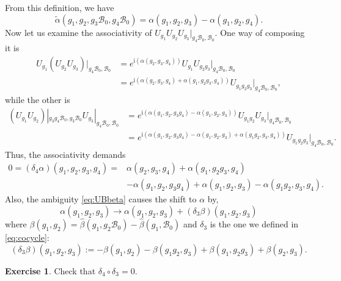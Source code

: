 \documentclass[
]{scrartcl}
\numberwithin{equation}{section}
\renewenvironment{align}{\begin{equation}\begin{aligned}}{\end{aligned}\end{equation}}
\theoremstyle{definition}
\theoremstyle{definition}
\theoremstyle{definition}
\newtheorem{exercise}{Exercise}[section]
\theoremstyle{definition}
\theoremstyle{remark}
\begin{document}
From this definition, we have
\begin{equation}
    \label{eq:alphatildealpha}
    \tilde{\alpha}(g_1,g_2,g_3\mathcal{B}_0,g_4\mathcal{B}_0) =     
    \alpha(g_1,g_2,g_3) - \alpha(g_1,g_2,g_4).
\end{equation}
Now let us examine the associativity of \(U_{g_1}U_{g_2}U_{g_3}|_{g_4\mathcal{B}_0,\mathcal{B}_0}\).
One way of composing it is
\begin{align}
    \label{eq:associative1}
    U_{g_1}(U_{g_2}U_{g_3})|_{g_4\mathcal{B}_0,\mathcal{B}_0}
    &= e^{\mathrm{i}(\alpha(g_2,g_3,g_4))}U_{g_1}U_{g_2g_3}|_{g_4\mathcal{B}_0,\mathcal{B}_0}\\
    &= e^{\mathrm{i}(\alpha(g_2,g_3,g_4)+\alpha(g_1,g_2g_3,g_4))}U_{g_1g_2g_3}|_{g_4\mathcal{B}_0,\mathcal{B}_0},
\end{align}
while the other is
\begin{align}
    \label{eq:associative2}
    (U_{g_1}U_{g_2})|_{g_3g_4\mathcal{B}_0,g_3\mathcal{B}_0}U_{g_3}|_{g_4\mathcal{B}_0,\mathcal{B}_0}
    &= e^{\mathrm{i}(\alpha(g_1,g_2,g_3g_4)-\alpha(g_1,g_2,g_3))}U_{g_1g_2}U_{g_3}|_{g_4\mathcal{B}_0,\mathcal{B}_0}\\
    &= e^{\mathrm{i}(\alpha(g_1,g_2,g_3g_4)-\alpha(g_1,g_2,g_3)+\alpha(g_1g_2,g_3,g_4))}U_{g_1g_2g_3}|_{g_4\mathcal{B}_0,\mathcal{B}_0}.
\end{align}
Thus, the associativity demands
\begin{align}
    \label{eq:3cocycle}
    0 = (\delta_4 \alpha) (g_1,g_2,g_3,g_4) = &\alpha(g_2,g_3,g_4) + \alpha (g_1,g_2g_3,g_4) \\&- \alpha(g_1,g_2,g_3g_4) + \alpha(g_1,g_2,g_3) - \alpha(g_1g_2,g_3,g_4).
\end{align}
Also, the ambiguity \eqref{eq:UBbeta} causes the shift to \(\alpha\) by,
\begin{equation}
    \label{eq:3coboundary}
    \alpha(g_1,g_2,g_3 )\to \alpha(g_1,g_2,g_3) + (\delta_3 \beta)(g_1,g_2,g_3)
\end{equation}
where \(\beta(g_1,g_2) = \hat\beta(g_1,g_2\mathcal{B}_0) - \hat\beta(g_1,\mathcal{B}_0)\) and \(\delta_3\) is the one we defined in \eqref{eq:cocycle}:
\begin{equation}
    \label{eq:d3again}
    (\delta_3 \beta)(g_1,g_2,g_3) := -\beta(g_1,g_2)-\beta(g_1g_2,g_3)+\beta(g_1,g_2g_3)+\beta(g_2,g_3).
\end{equation}

\begin{exercise}
Check that \(\delta_4\circ \delta_3 = 0\).
\end{exercise}
\end{document}
